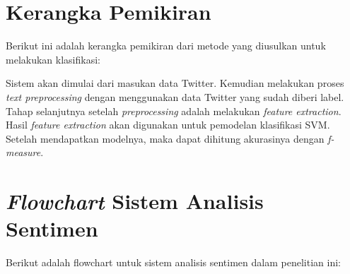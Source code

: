 \pagebreak

\section{Kerangka Pemikiran}
Berikut ini adalah kerangka pemikiran dari metode yang diusulkan untuk 
melakukan klasifikasi:

\begin{adjustbox}{width=1\textwidth}
\begin{minipage}{\linewidth}
\end{minipage}
\end{adjustbox}

Sistem akan dimulai dari masukan data Twitter. Kemudian melakukan proses \textit{text preprocessing} dengan menggunakan data Twitter yang sudah diberi label. Tahap selanjutnya setelah \textit{preprocessing} adalah melakukan \textit{feature extraction}. Hasil \textit{feature extraction }akan digunakan untuk pemodelan klasifikasi SVM. Setelah mendapatkan modelnya, maka dapat dihitung akurasinya dengan \textit{f-measure}.
 
\section{\textit{Flowchart} Sistem Analisis Sentimen}
Berikut adalah flowchart untuk sistem analisis sentimen dalam penelitian 
ini:

